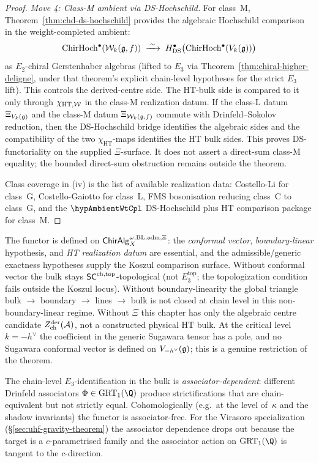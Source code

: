 \begin{proof}
\emph{Move 4: Class-M ambient via DS-Hochschild.}
For class~M, Theorem~\ref*{thm:chd-ds-hochschild} provides the
algebraic Hochschild comparison in the weight-completed ambient:
\[
 \mathrm{ChirHoch}^\bullet(\mathcal{W}_k(\mathfrak{g}, f))
 \;\xrightarrow{\;\sim\;}\;
 H^\bullet_{\mathrm{DS}}\bigl(\mathrm{ChirHoch}^\bullet(V_k(\mathfrak{g}))\bigr)
\]
as $E_2$-chiral Gerstenhaber algebras (lifted to $E_3$ via
Theorem~\ref*{thm:chiral-higher-deligne}, under that theorem's
explicit chain-level hypotheses for the strict $E_3$ lift). This
controls the derived-centre side. The HT-bulk side is compared to it
only through \(\chi_{\mathrm{HT},\mathcal{W}}\) in the class-M realization
datum. If the class-L datum \(\Xi_{V_k(\mathfrak{g})}\) and the class-M datum
\(\Xi_{\mathcal{W}_k(\mathfrak{g},f)}\) commute with Drinfeld--Sokolov reduction, then
the DS-Hochschild bridge identifies the algebraic sides and the
compatibility of the two \(\chi_{\mathrm{HT}}\)-maps identifies the HT
bulk sides. This proves DS-functoriality on the supplied
\(\Xi\)-surface. It does not assert a direct-sum class-M equality; the
bounded direct-sum obstruction remains outside the theorem.

Class coverage in (iv) is the list of available realization data:
Costello-Li for class~G, Costello-Gaiotto for class~L, FMS
bosonisation reducing class~C to class~G, and the
\(\hypAmbientWtCpl\) DS-Hochschild plus HT comparison package for
class~M.
\end{proof}

\begin{remark}
\label{rem:uhf-scope}
The functor is defined on
$\mathsf{ChirAlg}^{\omega,\mathrm{BL,adm},\Xi}_X$: the \emph{conformal
vector}, \emph{boundary-linear} hypothesis, and \emph{HT realization
datum} are essential, and the admissible/generic exactness hypotheses
supply the Koszul comparison surface. Without conformal vector the bulk stays
$\mathsf{SC}^{\mathrm{ch},\mathrm{top}}$-topological (not $E_3^{\mathrm{top}}$; the topologization
condition fails outside the Koszul locus). Without boundary-linearity
the global triangle bulk $\to$ boundary $\to$ lines $\to$ bulk is not
closed at chain level in this non-boundary-linear regime. Without
\(\Xi\) this chapter has only the algebraic centre candidate
\(Z^{\mathrm{der}}_{\mathrm{ch}}(\mathcal{A})\), not a constructed physical HT bulk. At the critical
level $k = -h^\vee$ the coefficient in the generic Sugawara tensor has
a pole, and no Sugawara conformal vector is defined on
$V_{-h^\vee}(\mathfrak{g})$; this is a genuine restriction of the theorem.
\end{remark}

\begin{remark}
\label{rem:uhf-associator}
The chain-level
$E_3$-identification in the bulk is \emph{associator-dependent}:
different Drinfeld associators $\Phi \in \mathrm{GRT}_1(\Q)$
produce strictifications that are chain-equivalent but not
strictly equal. Cohomologically (e.g.\ at the level of~$\kappa$
and the shadow invariants) the functor is associator-free. For
the Virasoro specialization (\S\ref{sec:uhf-gravity-theorem}) the
associator dependence drops out because the target is a
$c$-parametrised family and the associator action on
$\mathrm{GRT}_1(\Q)$ is tangent to the $c$-direction.
\end{remark}

